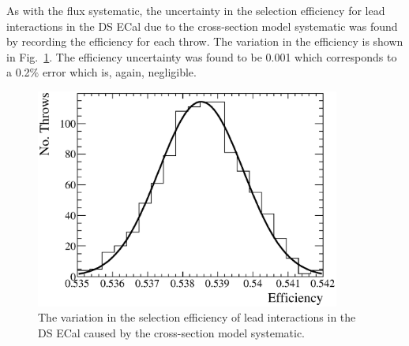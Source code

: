 \newline
As with the flux systematic, the uncertainty in the selection efficiency for lead interactions in the DS ECal due to the cross-section model systematic was found by recording the efficiency for each throw.  The variation in the efficiency is shown in Fig.~\ref{fig:XSecEfficiencyVariation}.  The efficiency uncertainty was found to be 0.001 which corresponds to a 0.2$\%$ error which is, again, negligible.
\begin{figure}[b!]
  \centering
  \includegraphics[width=10cm]{images/measurement/systematics/xsec/xsec_efficiency_variation.eps}
  \caption{The variation in the selection efficiency of lead interactions in the DS ECal caused by the cross-section model systematic.}
  \label{fig:XSecEfficiencyVariation}
\end{figure}
\newline
\newline
